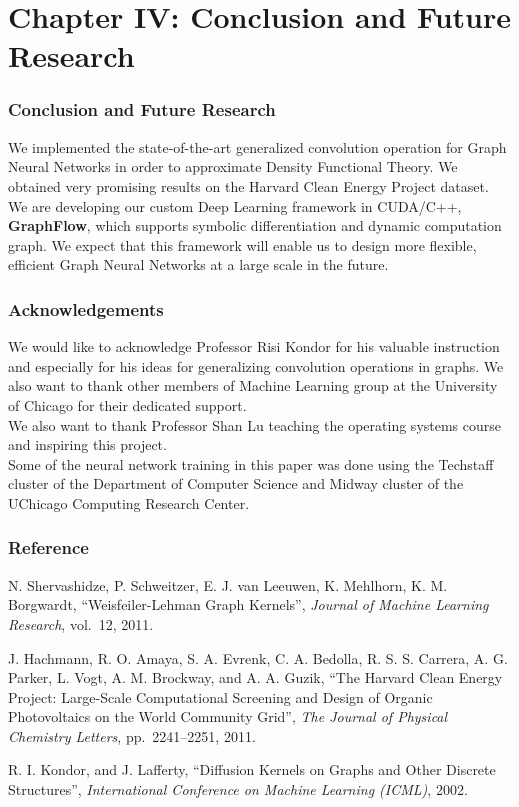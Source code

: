 \documentclass{beamer}
\begin{document}
\section{Chapter IV: Conclusion and Future Research}

\begin{frame}
\frametitle{Conclusion and Future Research}
\begin{justify}
We implemented the state-of-the-art generalized convolution operation for Graph Neural Networks in order to approximate Density Functional Theory. We obtained very promising results on the Harvard Clean Energy Project dataset.
$$$$
We are developing our custom Deep Learning framework in CUDA/C++, \textbf{GraphFlow}, which supports symbolic differentiation and dynamic computation graph. We expect that this framework will enable us to design more flexible, efficient Graph Neural Networks at a large scale in the future.
\end{justify}
\end{frame}

\begin{frame}
\frametitle{Acknowledgements}
\begin{justify}
We would like to acknowledge Professor Risi Kondor for his valuable instruction and especially for his ideas for generalizing convolution operations in graphs. We also want to thank other members of Machine Learning group at the University of Chicago for their dedicated support.
$$$$
We also want to thank Professor Shan Lu teaching the operating systems course and inspiring this project.
$$$$
Some of the neural network training in this paper was done using the Techstaff cluster of the Department of Computer Science and Midway cluster of the UChicago Computing Research Center.
\end{justify}
\end{frame}

\begin{frame}
\frametitle{Reference}
\begin{justify}
\begin{thebibliography}{9}

   N. Shervashidze, P. Schweitzer, E. J. van Leeuwen, K. Mehlhorn, K. M. Borgwardt,
   ``Weisfeiler-Lehman Graph Kernels'',
   \textit{Journal of Machine Learning Research}, vol.~12, 2011.
   
   J. Hachmann, R. O. Amaya, S. A. Evrenk, C. A. Bedolla, R. S. S. Carrera, A. G. Parker, L. Vogt, A. M. Brockway, and A. A. Guzik,
   ``The Harvard Clean Energy Project: Large-Scale Computational Screening and Design of Organic Photovoltaics on the World Community Grid'',
   \textit{The Journal of Physical Chemistry Letters}, pp.~2241--2251, 2011.

   R. I. Kondor, and J. Lafferty,
   ``Diffusion Kernels on Graphs and Other Discrete Structures'',
   \textit{International Conference on Machine Learning (ICML)}, 2002.
   
\end{thebibliography}
\end{justify}
\end{frame}
\end{document}
